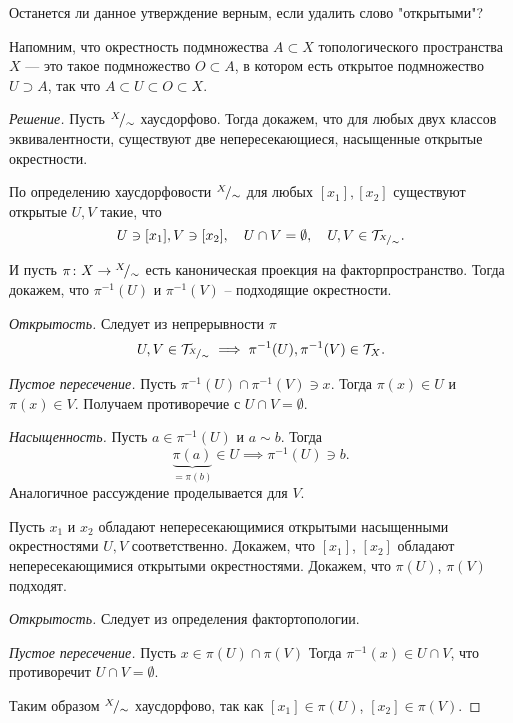 \documentclass[10pt]{article}
\begin{document}
\begin{tasks}
	Останется ли данное утверждение верным, если удалить слово "открытыми"?
	
	Напомним, что окрестность подмножества $A\subset X$ топологического пространства $X$ — это такое подмножество $O\subset A$, в котором есть открытое подмножество $U\supset A$, так что $A\subset U\subset O \subset X$.
	
	\begin{proof}[Решение]
		\fbox{$\implies$} \hspace{1ex} Пусть ${}^{X}\!/_{\sim}$ хаусдорфово. Тогда докажем, что для любых двух классов эквивалентности, существуют две непересекающиеся, насыщенные открытые окрестности.
		
		По определению хаусдорфовости ${}^{X}\!/_{\sim}$ для любых $[x_1], [x_2]$ существуют открытые $U, V$ такие, что \[U \ni [x_1], V \ni [x_2], \quad U \cap V = \emptyset, \quad U, V \in \mathcal T_{{}^{X}\!/_{\sim}}.\]
		
		И пусть $\pi\colon X \to {}^{X}\!/_{\sim}$ есть каноническая проекция на факторпространство. Тогда докажем, что $\pi^{-1}(U)$ и $\pi^{-1}(V)$ -- подходящие окрестности. 
		\begin{conditions}
			\item \textit{Открытость.} Следует из непрерывности $\pi$  \[U, V \in \mathcal T_{{}^{X}\!/_{\sim}} \implies \pi^{-1}(U), \pi^{-1}(V) \in \mathcal T_X.\]
			\item \textit{Пустое пересечение.} Пусть $\pi^{-1}(U)\cap \pi^{-1}(V) \ni x$. Тогда $\pi(x) \in U$ и $\pi(x) \in V$. Получаем противоречие с $U \cap V = \emptyset$.
			\item \textit{Насыщенность.} Пусть $a \in \pi^{-1}(U)$ и $a \sim b$. Тогда \[\underbrace{\pi(a)}_{=\pi(b)} \in U \implies \pi^{-1}(U) \ni b.\] Аналогичное рассуждение проделывается для $V$.
		\end{conditions} 
		
		\fbox{$\impliedby$} Пусть $x_1$ и $x_2$ обладают непересекающимися открытыми насыщенными окрестностями $U, V$ соответственно. Докажем, что $[x_1]$, $[x_2]$ обладают непересекающимися открытыми окрестностями. 
		Докажем, что $\pi(U)$, $\pi(V)$ подходят.
		\begin{conditions}
			\item \textit{Открытость.} Следует из определения фактортопологии. 
			\item \textit{Пустое пересечение.} Пусть $x \in \pi(U)\cap \pi(V)$ Тогда $\pi^{-1}(x) \in U \cap V$, что противоречит $U \cap V = \emptyset.$ 
		\end{conditions}
		Таким образом ${}^{X}\!/_{\sim}$ хаусдорфово, так как $[x_1] \in \pi(U)$, $[x_2] \in \pi(V).$ 
		

\end{proof}
\end{tasks}
\end{document}
